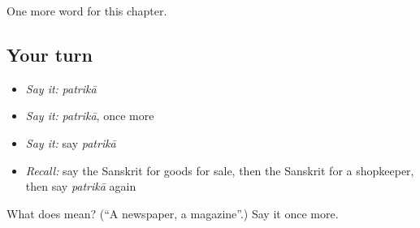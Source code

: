 \begin{grammarlens}[title={What you've built}]
One more word for this chapter.
\end{grammarlens}

\subsection*{Your turn}
\begin{itemize}
\raggedright
  \item \emph{Say it:} \emph{patrikā}
  \item \emph{Say it:} \emph{patrikā}, once more
  \item \emph{Say it:} say \emph{patrikā}
  \item \emph{Recall:} say the Sanskrit for goods for sale, then the Sanskrit for a shopkeeper, then say \emph{patrikā} again
\end{itemize}

\begin{tcolorbox}[breakable,colback=teal!4,colframe=teal!35!black,title={Before you move on}]
What does  mean? (\textquotedblleft{}A newspaper, a magazine\textquotedblright{}.) Say it once more.
\end{tcolorbox}

